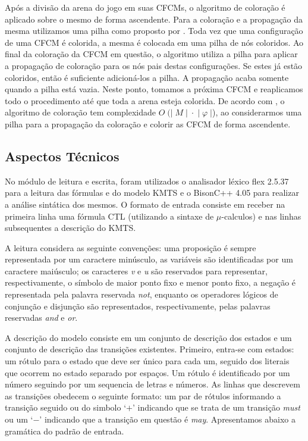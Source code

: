 \documentclass[normaltoc,capchap,capsec,times]{abnt}
\begin{document}
Após a divisão da arena do jogo em suas CFCMs, o algoritmo de coloração é aplicado sobre o mesmo de forma ascendente. Para a coloração e a propagação da mesma utilizamos uma pilha como proposto por \cite{grumbergalg}. Toda vez que uma configuração de uma CFCM é colorida, a mesma é colocada em uma pilha de nós coloridos. Ao final da coloração da CFCM em questão, o algoritmo utiliza a pilha para aplicar a propagação de coloração para os nós pais destas configurações. Se estes já estão coloridos, então é suficiente adicioná-los a pilha. A propagação acaba somente quando a pilha está vazia. Neste ponto, tomamos a próxima CFCM e reaplicamos todo o procedimento até que toda a arena esteja colorida. De acordo com \cite{grumbergalg}, o algoritmo de coloração tem complexidade $O \;(\vert \; M \;\vert \; \cdot \; \vert \; \varphi \; \vert$), ao considerarmos uma pilha para a  propagação da coloração e colorir as CFCM de forma ascendente.




\subsection{Aspectos Técnicos}
\label{sec:asptec}

No módulo de leitura e escrita, foram utilizados o analisador léxico flex 2.5.37 \cite{flex} para a leitura das fórmulas e do modelo KMTS e o BisonC++ 4.05 \cite{bison} para realizar a análise sintática dos mesmos. O formato de entrada consiste em receber na primeira linha uma fórmula CTL (utilizando a sintaxe de $\mu$-calculos) e nas linhas subsequentes a descrição do KMTS.

A leitura considera as seguinte convenções: uma proposição é sempre representada por um caractere minúsculo, as variáveis são identificadas por um caractere maiúsculo; os caracteres \textit{v} e \textit{u} são reservados para representar, respectivamente, o símbolo de maior ponto fixo e menor ponto fixo, a negação é representada pela palavra reservada \textit{not}, enquanto os operadores lógicos de conjunção e disjunção são representados, respectivamente, pelas palavras reservadas \textit{and} e \textit{or}. %

A descrição do modelo consiste em um conjunto de descrição dos estados e um conjunto de descrição das transições existentes. Primeiro, entra-se com estados: um rótulo para o estado que deve ser único para cada um, seguido dos literais que ocorrem no estado separado por espaços. Um rótulo é identificado por um número seguindo por um sequencia de letras e números. As linhas que descrevem as transições obedecem o seguinte formato: um par de rótulos informando a transição seguido ou do simbolo `$+$' indicando que se trata de um transição \textit{must} ou um `$-$' indicando que a transição em questão é \textit{may}. Apresentamos abaixo a gramática do padrão de entrada.
\end{document}
